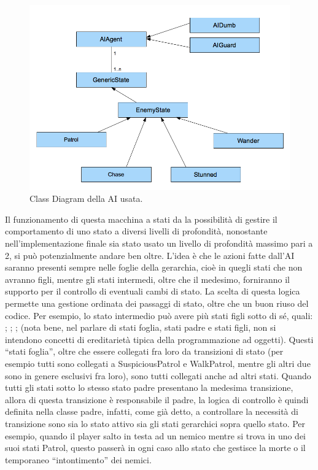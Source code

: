 \begin{figure}[h]
\centerline{\includegraphics[scale=0.45]{images/development/classdiagramAI.png}}
\caption{Class Diagram della AI usata.}
\label{fig:classdiagramAI}
\end{figure}

Il funzionamento di questa macchina a stati da la possibilità di gestire il comportamento di uno stato a diversi livelli di profondità, nonostante nell'implementazione finale sia stato usato un livello di profondità massimo pari a 2, si può potenzialmente andare ben oltre.
L'idea è che le azioni fatte dall'AI saranno presenti sempre nelle foglie della gerarchia, cioè in quegli stati che non avranno figli, mentre gli stati intermedi, oltre che il medesimo, forniranno il supporto per il controllo di eventuali cambi di stato.
La scelta di questa logica permette una gestione ordinata dei passaggi di stato, oltre che un buon riuso del codice. Per esempio, lo stato intermedio  può avere più stati figli sotto di sé, quali: ; ; ;  (nota bene, nel parlare di stati foglia, stati padre e stati figli, non si intendono concetti di ereditarietà tipica della programmazione ad oggetti). Questi ``stati foglia'', oltre che essere collegati fra loro da transizioni di stato (per esempio tutti sono collegati a SuspiciousPatrol e WalkPatrol, mentre gli altri due sono in genere esclusivi fra loro), sono tutti collegati anche ad altri stati. Quando tutti gli stati sotto lo stesso stato padre presentano la medesima transizione, allora di questa transizione è responsabile il padre, la logica di controllo è quindi definita nella classe padre, infatti, come già detto, a controllare la necessità di transizione sono sia lo stato attivo sia gli stati gerarchici sopra quello stato. Per esempio, quando il player salto in testa ad un nemico mentre si trova in uno dei suoi stati Patrol, questo passerà in ogni caso allo stato  che gestisce la morte o il temporaneo ``intontimento'' dei nemici.


